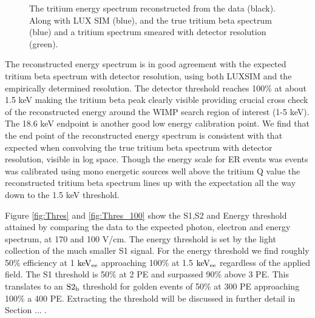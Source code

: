 \begin{figure}[h!]
\caption{The tritium energy spectrum reconstructed from the data (black). Along with LUX SIM (blue), and the true tritium beta spectrum (blue) and a tritium spectrum smeared with detector resolution (green). }
\label{fig:E_spec}
\end{figure}

The reconstructed energy spectrum is in good agreement with the expected tritium beta spectrum with detector resolution, using both LUXSIM and the empirically determined resolution. The detector threshold reaches 100\% at about 1.5 keV making the tritium beta peak clearly visible providing crucial cross check of the reconstructed energy around the WIMP search region of interest (1-5 keV). The 18.6 keV endpoint is another good low energy calibration point. We find that the end point of the reconstructed energy spectrum is consistent with that expected when convolving the true tritium beta spectrum with detector resolution, visible in log space. Though the energy scale for ER events was events was calibrated using mono energetic sources well above the tritium Q value the reconstructed tritium beta spectrum lines up with the expectation all the way down to the 1.5 keV threshold.


Figure \ref{fig:Thres} and \ref{fig:Thres_100} show the S1,S2 and Energy threshold attained by comparing the data to the expected photon, electron and energy spectrum, at 170 and 100 V/cm. The energy threshold is set by the light collection of the much smaller S1 signal. For the energy threshold we find roughly 50\% efficiency at 1 $\rm keV_{ee}$ approaching 100\% at 1.5 $\rm keV_{ee}$ regardless of the applied field. The S1 threshold is 50\% at 2 PE and surpassed 90\% above 3 PE. This translates to an $\rm S2_b$ threshold for golden events of 50\% at 300 PE approaching 100\% a 400 PE. Extracting the threshold will be discussed in further detail in Section ... .


